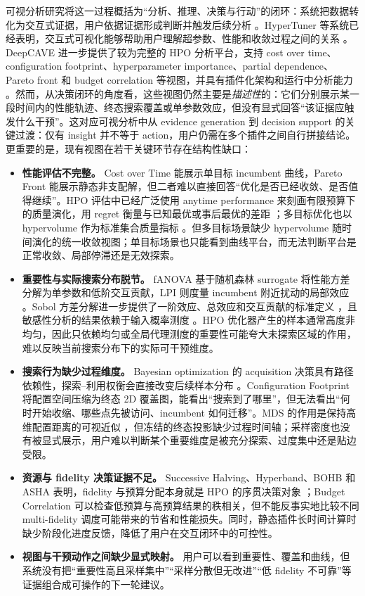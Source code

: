 \documentclass[11pt,a4paper]{ctexart}
\begin{document}
可视分析研究将这一过程概括为“分析、推理、决策与行动”的闭环：系统把数据转化为交互式证据，用户依据证据形成判断并触发后续分析 \cite{keim2008visual}。HyperTuner 等系统已经表明，交互式可视化能够帮助用户理解超参数、性能和收敛过程之间的关系 \cite{hyptertuner2018}。DeepCAVE 进一步提供了较为完整的 HPO 分析平台，支持 cost over time、configuration footprint、hyperparameter importance、partial dependence、Pareto front 和 budget correlation 等视图，并具有插件化架构和运行中分析能力 \cite{segel2025deepcave}。然而，从决策闭环的角度看，这些视图仍然主要是\emph{描述性}的：它们分别展示某一段时间内的性能轨迹、终态搜索覆盖或单参数效应，但没有显式回答“该证据应触发什么干预”。这对应可视分析中从 evidence generation 到 decision support 的关键过渡：仅有 insight 并不等于 action，用户仍需在多个插件之间自行拼接结论。更重要的是，现有视图在若干关键环节存在结构性缺口：
\begin{itemize}
    \item \textbf{性能评估不完整。} Cost over Time 能展示单目标 incumbent 曲线，Pareto Front 能展示静态非支配解，但二者难以直接回答“优化是否已经收敛、是否值得继续”。HPO 评估中已经广泛使用 anytime performance 来刻画有限预算下的质量演化，用 regret 衡量与已知最优或事后最优的差距 \cite{erickson2020autogluon,klein2017fast}；多目标优化也以 hypervolume 作为标准集合质量指标 \cite{zitzler1999spea,while2006faster}。但多目标场景缺少 hypervolume 随时间演化的统一收敛视图；单目标场景也只能看到曲线平台，而无法判断平台是正常收敛、局部停滞还是无效探索。
    \item \textbf{重要性与实际搜索分布脱节。} fANOVA 基于随机森林 surrogate 将性能方差分解为单参数和低阶交互贡献，LPI 则度量 incumbent 附近扰动的局部效应 \cite{hutter2014importance,biedenkapp2018cave}。Sobol 方差分解进一步提供了一阶效应、总效应和交互贡献的标准定义 \cite{sobol2001global,saltelli2010variance}，且敏感性分析的结果依赖于输入概率测度 \cite{kucherenko2012dependent}。HPO 优化器产生的样本通常高度非均匀，因此只依赖均匀或全局代理测度的重要性可能夸大未探索区域的作用，难以反映当前搜索分布下的实际可干预维度。
    \item \textbf{搜索行为缺少过程维度。} Bayesian optimization 的 acquisition 决策具有路径依赖性，探索--利用权衡会直接改变后续样本分布 \cite{snoek2012practical,frazier2018tutorial,shahriari2016taking}。Configuration Footprint 将配置空间压缩为终态 2D 覆盖图，能看出“搜索到了哪里”，但无法看出“何时开始收缩、哪些点先被访问、incumbent 如何迁移”。MDS 的作用是保持高维配置距离的可视近似 \cite{kruskal1964mds}，但冻结的终态投影缺少过程时间轴；采样密度也没有被显式展示，用户难以判断某个重要维度是被充分探索、过度集中还是贴边受限。
    \item \textbf{资源与 fidelity 决策证据不足。} Successive Halving、Hyperband、BOHB 和 ASHA 表明，fidelity 与预算分配本身就是 HPO 的序贯决策对象 \cite{jamieson2016nonstochastic,li2018hyperband,falkner2018bohb}；Budget Correlation 可以检查低预算与高预算结果的秩相关，但不能反事实地比较不同 multi-fidelity 调度可能带来的节省和性能损失。同时，静态插件长时间计算时缺少阶段化进度反馈，降低了用户在交互闭环中的可控性。
    \item \textbf{视图与干预动作之间缺少显式映射。} 用户可以看到重要性、覆盖和曲线，但系统没有把“重要性高且采样集中”“采样分散但无改进”“低 fidelity 不可靠”等证据组合成可操作的下一轮建议。
\end{itemize}
\end{document}

